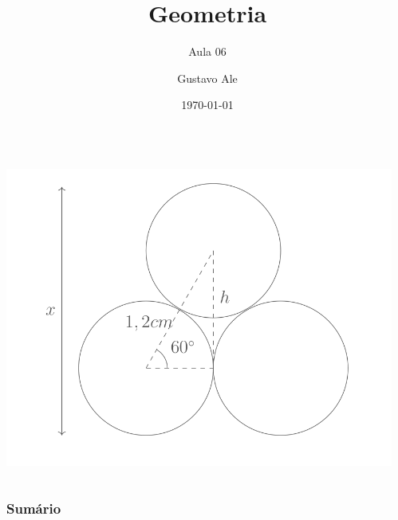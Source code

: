 \documentclass[handout]{beamer}
\title{Geometria} %
\subtitle{Aula 06}
\author{Gustavo Ale} %
\institute[UFMT] %
{
EduCursinho - Faculdade de Engenharia \\ %
\medskip
\textit{gustavo.engca@gmail.com} %
}
\date{\today} %
\begin{document}
{
\begin{frame}
    \begin{columns}
        \begin{column}{0.48\textwidth}
            \includegraphics[width=\columnwidth,left]{../assets/geo.png}
        \end{column}
        \begin{column}{0.48\textwidth}
            \titlepage
        \end{column}
    \end{columns}

\end{frame}
}


\begin{frame}
    \frametitle{Sumário} %
    \tableofcontents %
\end{frame}
\end{document}
